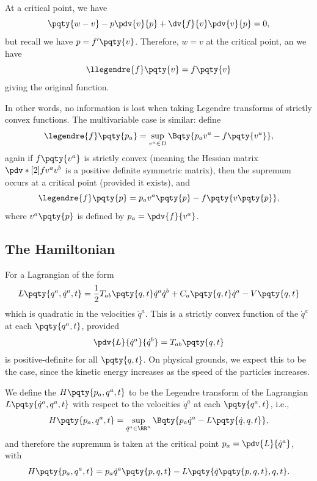 At a critical point, we have
\begin{equation}
    \pqty{w - v} - p \pdv{v}{p} + \dv{f}{v} \pdv{v}{p} = 0,
\end{equation}
but recall we have \(p = f'\pqty{v}\). Therefore, \(w = v\) at the critical point, an we have
\begin{equation}
    \llegendre{f}\pqty{v} = f\pqty{v}
\end{equation}
giving the original function.

In other words, no information is lost when taking Legendre transforms of strictly convex functions. The multivariable case is similar: define
\begin{equation}
    \legendre{f} \pqty{p_a} = \sup_{v^a \in D} \Bqty{p_a v^a - f\pqty{v^a}},
\end{equation}
again if \(f\pqty{v^a}\) is strictly convex (meaning the Hessian matrix \(\pdv*[2]{f}{v^a}{v^b}\) is a positive definite symmetric matrix), then the supremum occurs at a critical point (provided it exists), and
\begin{equation}
    \legendre{f} \pqty{p} = p_a v^a \pqty{p} - f\pqty{v\pqty{p}},
\end{equation}
where \(v^a\pqty{p}\) is defined by \(p_a = \pdv{f}{v^a}\).

\subsection{The Hamiltonian}

For a Lagrangian of the form
\begin{equation}
    L\pqty{q^a, \dot{q}^a, t} = \frac{1}{2} T_{ab} \pqty{q, t} \dot{q}^a \dot{q}^b + C_a \pqty{q, t} \dot{q}^a - V\pqty{q, t}
\end{equation}
which is quadratic in the velocities \(\dot{q}^a\). This is a strictly convex function of the \(\dot{q}^a\) at each \(\pqty{q^a, t}\), provided
\begin{equation}
    \pdv{L}{\dot{q}^a}{\dot{q}^b} = T_{ab}\pqty{q, t}
\end{equation}
is positive-definite for all \(\pqty{q, t}\). On physical grounds, we expect this to be the case, since the kinetic energy increases as the speed of the particles increases.

We define the  \(H\pqty{p_a, q^a, t}\) to be the Legendre transform of the Lagrangian \(L\pqty{\dot{q}^a, q^a, t}\) with respect to the velocities \(\dot{q}^a\) at each \(\pqty{q^a, t}\), i.e.,
\begin{equation}
    H\pqty{p_a, q^a, t} = \sup_{\dot{q}^a \in \RR^n} \Bqty{p_a \dot{q}^a - L\pqty{\dot{q}, q, t}},
\end{equation}
and therefore the supremum is taken at the critical point \(p_a = \pdv{L}{\dot{q}^a}\), with
\begin{equation}
    H\pqty{p_a, q^a, t} = p_a \dot{q}^a\pqty{p, q, t} - L\pqty{\dot{q}\pqty{p, q, t}, q, t}.
\end{equation}

